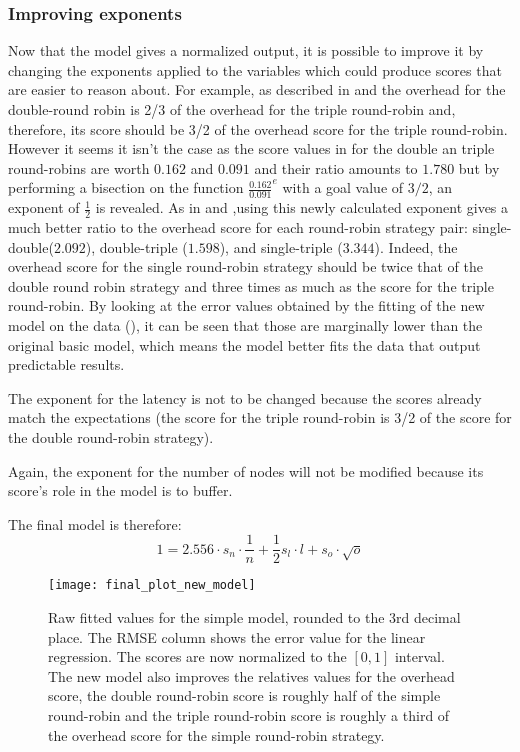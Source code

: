 \subsubsection{Improving exponents}
Now that the model gives a normalized output, it is possible to improve it by
changing the exponents applied to the variables which could produce scores that
are easier to reason about. For example, as described in 
and  the
overhead for the double-round robin is 2/3 of the overhead for the triple
round-robin and, therefore, its score should be 3/2 of the overhead score for the
triple round-robin. 
However it seems it isn't the case as the score values in 
for the double an triple round-robins are worth $0.162$ and $0.091$ and their
ratio amounts to $1.780$ but by performing a bisection on the function
\(\frac{0.162}{0.091}^e\) with a goal value of $3/2$, an exponent of
\(\frac{1}{2}\) is revealed.
As in  and ,using this newly
calculated exponent gives a much better ratio to the overhead score for each
round-robin strategy pair: single-double($2.092$), double-triple ($1.598$), and
single-triple ($3.344$).
Indeed, the overhead score for the single round-robin strategy
should be twice that of the double round robin strategy and three times as
much as the score for the triple round-robin. By looking at the error values
obtained by the fitting of the new model on the data
(), it can be seen that those are marginally lower than
the original basic model, which means the model better fits the data that output
predictable results. 

The exponent for the latency is not to be changed because the scores already
match the expectations (the score for the triple round-robin is 3/2 of the score
for the double round-robin strategy). 

Again, the exponent for the number of nodes will not be modified because its
score's role in the model is to buffer.

The final model is therefore: 
\[1 = 2.556\cdot s_n \cdot \frac{1}{n} + \frac{1}{2} s_l\cdot l + s_o\cdot
\sqrt{o}\]

\begin{figure}[h]
    \centering
    \texttt{[image: final\_plot\_new\_model]}
    \caption{Raw fitted values for the simple model, rounded to the 3rd
        decimal place. The RMSE column shows the error value for the linear
        regression. The scores are now normalized to the \([0, 1]\)
        interval. The new model also improves the relatives values for the
        overhead score, the double round-robin score is roughly half of
        the simple round-robin and the triple round-robin score is roughly a
        third of the overhead score for the simple round-robin strategy.}
    \label{fig:recapTestsPlotNew}
\end{figure}

